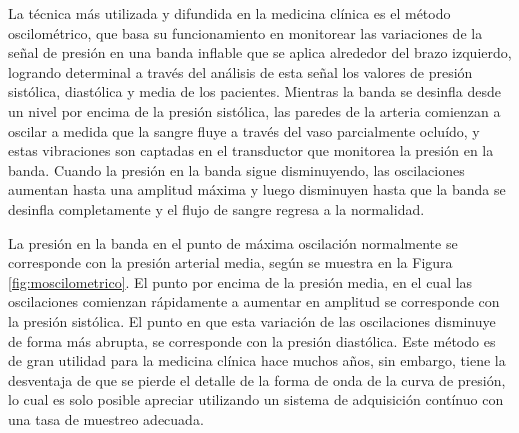 La técnica más utilizada y difundida en la medicina clínica es el método oscilométrico, que basa su funcionamiento en monitorear las variaciones de la señal de presión en una banda inflable que se aplica alrededor del brazo izquierdo, logrando determinal a través del análisis de esta señal los valores de presión sistólica, diastólica y media de los pacientes. Mientras la banda se desinfla desde un nivel por encima de la presión sistólica, las paredes de la arteria comienzan a oscilar a medida que la sangre fluye a través del vaso parcialmente ocluído, y estas vibraciones son captadas en el transductor que monitorea la presión en la banda. Cuando la presión en la banda sigue disminuyendo, las oscilaciones aumentan hasta una amplitud máxima y luego disminuyen  hasta que la banda se desinfla completamente y el flujo de sangre regresa a la normalidad.

La presión en la banda en el punto de máxima oscilación normalmente se corresponde con la presión arterial media, según se muestra en la Figura \ref{fig:moscilometrico}. El punto por encima de la presión media, en el cual las oscilaciones comienzan rápidamente a aumentar en amplitud se corresponde con la presión sistólica. El punto en que esta variación de las oscilaciones disminuye de forma más abrupta, se corresponde con la presión diastólica. Este método es de gran utilidad para la medicina clínica hace muchos años, sin embargo, tiene la desventaja de que se pierde el detalle de la forma de onda de la curva de presión, lo cual es solo posible apreciar utilizando un sistema de adquisición contínuo con una tasa de muestreo adecuada.


